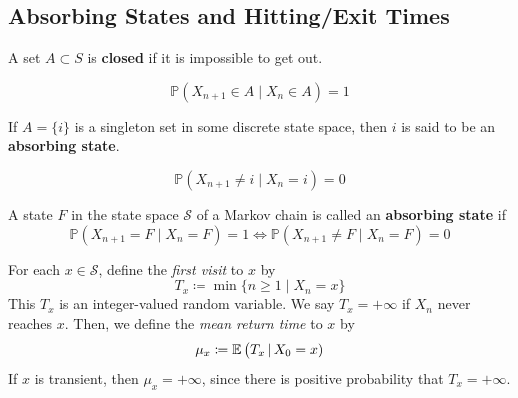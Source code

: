 \subsection{Absorbing States and Hitting/Exit Times} 

	\begin{definition}
		\label{def:closed-set-absorbing-state}
		A set $A \subset S$ is \textbf{closed} if it is impossible to get out. 

			\begin{equation}
				\mathbb{P}(X_{n + 1} \in A \mid X_n \in A) = 1
			\end{equation}

		If $A = \{i\}$ is a singleton set in some discrete state space, then $i$ is said to be an \textbf{absorbing state}. 

			\begin{equation}
				\mathbb{P}(X_{n+1} \neq i \; | \; X_n = i) = 0
			\end{equation}
	\end{definition}

  \begin{example}
    \label{def:absorbing-state}
    A state $F$ in the state space $\mathcal{S}$ of a Markov chain is called an \textbf{absorbing state} if
    \begin{equation}
      \mathbb{P}(X_{n+1} = F \; | \; X_n = F) = 1 \iff \mathbb{P}(X_{n+1} \neq F \; | \; X_n = F) = 0
    \end{equation}
  \end{example}

  \begin{definition}
    \label{def:first-visit}
    For each $x \in \mathcal{S}$, define the \textit{first visit} to $x$ by 
    \begin{equation}
      T_x \coloneqq \min\{ n \geq 1 \; | \; X_n = x\}
    \end{equation}
    This $T_x$ is an integer-valued random variable. We say $T_x = + \infty$ if $X_n$ never reaches $x$. Then, we define the \textit{mean return time} to $x$ by 
    \begin{equation}
      \mu_x \coloneqq \operatorname{\mathbb{E}}\big( T_x \, | \, X_0 = x)
    \end{equation}
    If $x$ is transient, then $\mu_x = + \infty$, since there is positive probability that $T_x = + \infty$. 
  \end{definition}

